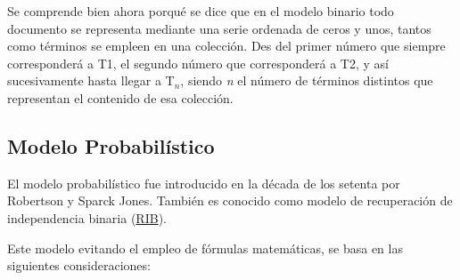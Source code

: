 \documentclass[titlepage]{article}
\begin{document}
Se comprende bien ahora porqué se dice que en el modelo binario todo documento se representa mediante una serie ordenada de ceros y unos, tantos como términos se empleen en una colección. Des del primer número que siempre corresponderá a T1, el segundo número que corresponderá a T2, y así sucesivamente hasta llegar a T$_{n}$, siendo \textit{n} el número de términos distintos que representan el contenido de esa colección.

\subsection{Modelo Probabilístico}

El modelo probabilístico fue introducido en la década de los setenta por Robertson\cite{robertson} y Sparck Jones\cite{sparckjones}. También es conocido como modelo de recuperación de independencia binaria (\href{https://es.wikipedia.org/wiki/Modelo_de_independencia_binaria}{RIB}). 

Este modelo evitando el empleo de fórmulas matemáticas, se basa en las siguientes consideraciones:
\end{document}
